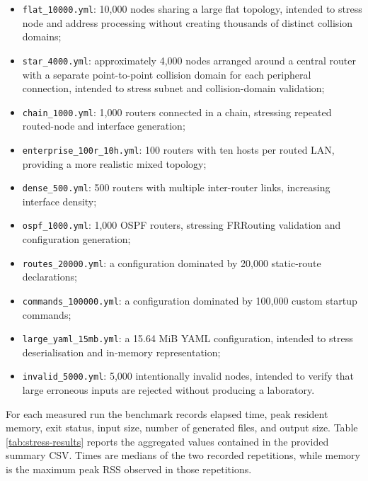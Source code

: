 \begin{itemize}
    \item \texttt{flat\_10000.yml}: 10,000 nodes sharing a large flat
    topology, intended to stress node and address processing without creating
    thousands of distinct collision domains;
    \item \texttt{star\_4000.yml}: approximately 4,000 nodes arranged around
    a central router with a separate point-to-point collision domain for each
    peripheral connection, intended to stress subnet and collision-domain
    validation;
    \item \texttt{chain\_1000.yml}: 1,000 routers connected in a chain,
    stressing repeated routed-node and interface generation;
    \item \texttt{enterprise\_100r\_10h.yml}: 100 routers with ten hosts per
    routed LAN, providing a more realistic mixed topology;
    \item \texttt{dense\_500.yml}: 500 routers with multiple inter-router
    links, increasing interface density;
    \item \texttt{ospf\_1000.yml}: 1,000 OSPF routers, stressing FRRouting
    validation and configuration generation;
    \item \texttt{routes\_20000.yml}: a configuration dominated by 20,000
    static-route declarations;
    \item \texttt{commands\_100000.yml}: a configuration dominated by 100,000
    custom startup commands;
    \item \texttt{large\_yaml\_15mb.yml}: a 15.64 MiB YAML configuration,
    intended to stress deserialisation and in-memory representation;
    \item \texttt{invalid\_5000.yml}: 5,000 intentionally invalid nodes,
    intended to verify that large erroneous inputs are rejected without
    producing a laboratory.
\end{itemize}

For each measured run the benchmark records elapsed time, peak resident memory,
exit status, input size, number of generated files, and output size. Table
\ref{tab:stress-results} reports the aggregated values contained in the
provided summary CSV. Times are medians of the two recorded repetitions, while
memory is the maximum peak RSS observed in those repetitions.

